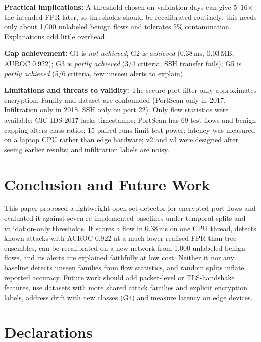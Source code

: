 \documentclass[pdflatex,sn-mathphys-num,iicol]{sn-jnl}%
\newcommand{\ms}{\,ms}
\begin{document}
\textbf{Practical implications:} A threshold chosen on validation days can give 5--16$\times$ the intended FPR later, so thresholds should be recalibrated routinely; this needs only about 1,000 unlabeled benign flows and tolerates 5\% contamination. Explanations add little overhead.

\textbf{Gap achievement:} G1 is \emph{not achieved}; G2 is \emph{achieved} (0.38\ms, 0.03\,MB, AUROC 0.922); G3 is \emph{partly achieved} (3/4 criteria, SSH transfer fails); G5 is \emph{partly achieved} (5/6 criteria, few unseen alerts to explain).

\textbf{Limitations and threats to validity:} The secure-port filter only approximates encryption. Family and dataset are confounded (PortScan only in 2017, Infiltration only in 2018, SSH only on port 22). Only flow statistics were available; CIC-IDS-2017 lacks timestamps; PortScan has 69 test flows and benign capping alters class ratios; 15 paired runs limit test power; latency was measured on a laptop CPU rather than edge hardware; v2 and v3 were designed after seeing earlier results; and infiltration labels are noisy.

\section{Conclusion and Future Work}\label{sec:conclusion}

This paper proposed a lightweight open-set detector for encrypted-port flows and evaluated it against seven re-implemented baselines under temporal splits and validation-only thresholds. It scores a flow in 0.38\ms{} on one CPU thread, detects known attacks with AUROC 0.922 at a much lower realised FPR than tree ensembles, can be recalibrated on a new network from 1,000 unlabeled benign flows, and its alerts are explained faithfully at low cost. Neither it nor any baseline detects unseen families from flow statistics, and random splits inflate reported accuracy. Future work should add packet-level or TLS-handshake features, use datasets with more shared attack families and explicit encryption labels, address drift with new classes (G4) and measure latency on edge devices.

\backmatter

\section*{Declarations}
\end{document}
